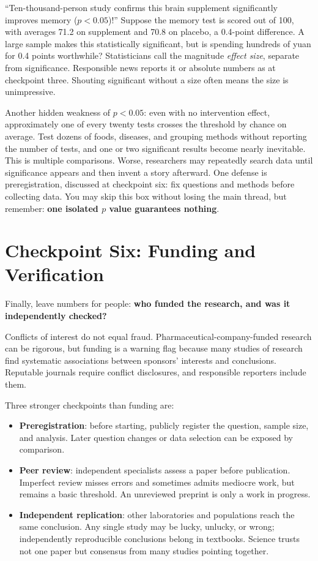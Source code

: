 ``Ten-thousand-person study confirms this brain supplement significantly improves memory ($p<0.05$)!'' Suppose the memory test is scored out of 100, with averages 71.2 on supplement and 70.8 on placebo, a 0.4-point difference. A large sample makes this statistically significant, but is spending hundreds of yuan for 0.4 points worthwhile? Statisticians call the magnitude \emph{effect size}, separate from significance. Responsible news reports it or absolute numbers as at checkpoint three. Shouting significant without a size often means the size is unimpressive.

\begin{tiaozhan}
Another hidden weakness of $p<0.05$: even with no intervention effect, approximately one of every twenty tests crosses the threshold by chance on average. Test dozens of foods, diseases, and grouping methods without reporting the number of tests, and one or two significant results become nearly inevitable. This is multiple comparisons. Worse, researchers may repeatedly search data until significance appears and then invent a story afterward. One defense is preregistration, discussed at checkpoint six: fix questions and methods before collecting data. You may skip this box without losing the main thread, but remember: \textbf{one isolated $p$ value guarantees nothing}.
\end{tiaozhan}

\section{Checkpoint Six: Funding and Verification}

Finally, leave numbers for people: \textbf{who funded the research, and was it independently checked?}

Conflicts of interest do not equal fraud. Pharmaceutical-company-funded research can be rigorous, but funding is a warning flag because many studies of research find systematic associations between sponsors' interests and conclusions. Reputable journals require conflict disclosures, and responsible reporters include them.

Three stronger checkpoints than funding are:

\begin{itemize}[itemsep=2pt]
\item \textbf{Preregistration}: before starting, publicly register the question, sample size, and analysis. Later question changes or data selection can be exposed by comparison.
\item \textbf{Peer review}: independent specialists assess a paper before publication. Imperfect review misses errors and sometimes admits mediocre work, but remains a basic threshold. An unreviewed preprint is only a work in progress.
\item \textbf{Independent replication}: other laboratories and populations reach the same conclusion. Any single study may be lucky, unlucky, or wrong; independently reproducible conclusions belong in textbooks. Science trusts not one paper but consensus from many studies pointing together.
\end{itemize}

